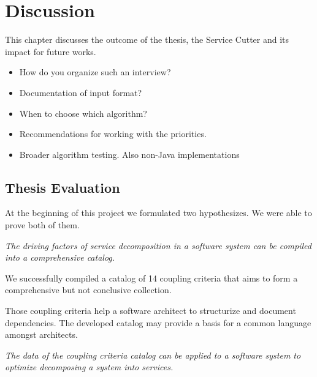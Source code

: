 \chapter{Discussion}

This chapter discusses the outcome of the thesis, the Service Cutter and its impact for future works.

\begin{itemize}
\item How do you organize such an interview?
\item Documentation of input format?
\item When to choose which algorithm?
\item Recommendations for working with the priorities.
\item Broader algorithm testing. Also non-Java implementations
\end{itemize}


\section{Thesis Evaluation}

At the beginning of this project we formulated two hypothesizes. We were able to prove both of them.

\textit{The driving factors of service decomposition in a software system can be compiled into a comprehensive catalog.}

We successfully compiled a catalog of 14 coupling criteria that aims to form a comprehensive but not conclusive collection. 

Those coupling criteria help a software architect to structurize and document dependencies. The developed catalog may provide a basis for a common language amongst architects. 


\textit{The data of the coupling criteria catalog can be applied to a software system to optimize decomposing a system into services.}

